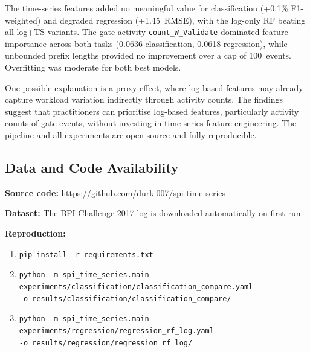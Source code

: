 \documentclass[runningheads]{llncs}
\begin{document}
The time-series features added no meaningful value for classification
(+0.1\% F1-weighted) and degraded regression (+1.45~RMSE), with the
log-only RF beating all log+TS variants. The gate activity
\texttt{count\_W\_Validate} dominated feature importance across both
tasks (0.0636 classification, 0.0618 regression), while unbounded prefix
lengths provided no improvement over a cap of 100~events. Overfitting
was moderate for both best models.

One possible explanation is a proxy effect, where log-based features may
already capture workload variation indirectly through activity counts.
The findings suggest that practitioners can prioritise log-based features,
particularly activity counts of gate events, without investing in
time-series feature engineering. The pipeline and all experiments are
open-source and fully reproducible.

\subsection*{Data and Code Availability}

\textbf{Source code:}
\url{https://github.com/durki007/spi-time-series}

\textbf{Dataset:}
The BPI Challenge 2017 log is downloaded automatically on first run.

\textbf{Reproduction:}
\begin{enumerate}
    \item \texttt{pip install -r requirements.txt}
    \item \texttt{python -m spi\_time\_series.main}\\
          \texttt{experiments/classification/classification\_compare.yaml}\\
          \texttt{-o results/classification/classification\_compare/}
    \item \texttt{python -m spi\_time\_series.main}\\
          \texttt{experiments/regression/regression\_rf\_log.yaml}\\
          \texttt{-o results/regression/regression\_rf\_log/}
\end{enumerate}


\end{document}
